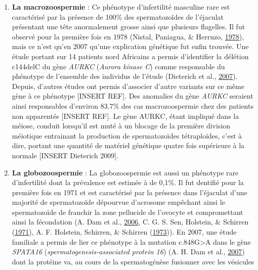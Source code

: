 \documentclass[12pt,twoside]{reedthesis}
\providecommand{\tightlist}{%
  \setlength{\itemsep}{0pt}\setlength{\parskip}{0pt}}
\theoremstyle{definition}
\theoremstyle{definition}
\theoremstyle{remark}
\begin{document}
\begin{enumerate}
    \begin{enumerate}
    \def\labelenumii{\alph{enumii}.}
    \tightlist
    \item
      \textbf{La macrozoospermie} : Ce phénotype d'infertilité masculine
      rare est caractérisé par la présence de 100\% des spermatozoïdes de
      l'éjaculat présentant une tête anormalement grosse ainsi que
      plusieurs flagelles. Il fut observé pour la première fois en 1978
      (Nistal, Paniagua, \& Herruzo,
      \protect\hyperlink{ref-Nistal}{1978}), mais ce n'est qu'en 2007
      qu'une explication génétique fut enfin trouvée. Une étude portant
      sur 14 patients nord Africains a permis d'identifier la délétion
      c144delC du gène \emph{AURKC} (\emph{Aurora kinase C}) comme
      responsable du phénotype de l'ensemble des individus de l'étude
      (Dieterich et al., \protect\hyperlink{ref-Dieterich2007}{2007}).
      Depuis, d'autres études ont permis d'associer d'autre variants sur
      ce même gène à ce phénotype {[}INSERT REF{]}. Des anomalies du gène
      \emph{AURKC} seraient ainsi responsables d'environ 83.7\% des cas
      macrozoospermie chez des patients non apparentés {[}INSERT REF{]}.
      Le gène AURKC, étant impliqué dans la méiose, conduit lorsqu'il est
      muté à un blocage de la première division méiotique entrainant la
      production de spermatozoïdes tétraploïdes, c'est à dire, portant une
      quantité de matériel génétique quatre fois supérieure à la normale
      {[}INSERT Dieterich 2009{]}.\\
    \item
      \textbf{La globozoospermie} : La globozoospermie est aussi un
      phénotype rare d'infertilité dont la prévalence est estimée à de
      0,1\%. Il fut dentifié pour la première fois en 1971 et est
      caractérisé par la présence dans l'éjaculat d'une majorité de
      spermatozoïde dépourvue d'acrosome empêchant ainsi le spermatozoïde
      de franchir la zone pellucide de l'ovocyte et compromettant ainsi la
      fécondation (A. Dam et al., \protect\hyperlink{ref-Dam2006}{2006},
      C. G. S. Sen, Holstein, \& Schirren
      (\protect\hyperlink{ref-Sen2009}{1971}), A. F. Holstein, Schirren,
      \& Schirren (\protect\hyperlink{ref-Holstein1973}{1973})). En 2007,
      une étude familiale a permis de lier ce phénotype à la mutation
      c.848G\textgreater{}A dans le gène \emph{SPATA16}
      (\emph{spermatogenesis-associated protein 16}) (A. H. Dam et al.,
      \protect\hyperlink{ref-Dam2007a}{2007}) dont la protéine va, au
      cours de la spermatogénèse fusionner avec les vésicules

\end{enumerate}
\end{enumerate}
\end{document}

